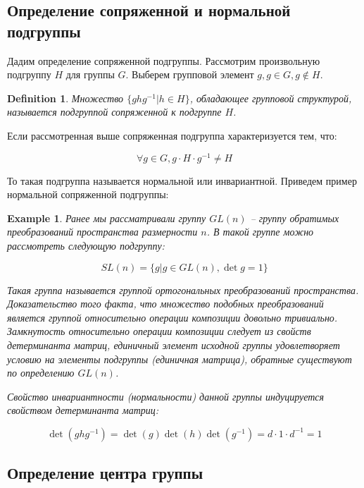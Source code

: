 \documentclass[10pt,a4paper]{article}
\newtheorem{defin}{Definition}
\newtheorem{exmpl}{Example}
\begin{document}
		\subsection{Определение сопряженной и нормальной подгруппы}

		 Дадим определение сопряженной подгруппы. Рассмотрим произвольную 
		 подгруппу $H$ для группы $G$. Выберем групповой элемент $g, g \in G,
		  g \notin H$.
		
		\begin{defin}
			 Множество $\lbrace ghg^{-1} | h \in H\rbrace$, обладающее
			 групповой структурой, называется подгруппой сопряженной к
			 подгруппе $H$.
		\end{defin}
		
		Если рассмотренная выше сопряженная подгруппа характеризуется тем, что:
		
		$$\forall g \in G, g\cdot H \cdot g^{-1} \neq H$$
		
		То такая подгруппа называется нормальной или инвариантной. Приведем 
		пример нормальной сопряженной подгруппы:
		
		\begin{exmpl}
			Ранее мы рассматривали группу $GL\left(n\right)$ -- группу 
			обратимых преобразований пространства размерности $n$. В такой 
			группе можно рассмотреть следующую подгруппу:
			
			$$SL\left(n\right) = \lbrace g \left.\right| g \in 
			GL\left(n\right), \det g = 1 \rbrace$$
			
			Такая группа называется группой ортогональных преобразований 
			пространства. Доказательство того факта, что множество подобных 
			преобразований является группой относительно операции композиции 
			довольно тривиально. Замкнутость относительно операции композиции 
			следует из свойств детерминанта матриц, единичный элемент исходной 
			группы удовлетворяет условию на элементы подгруппы (единичная 
			матрица), обратные существуют по определению $GL\left(n\right)$.
			
			Свойство инвариантности (нормальности) данной группы индуцируется 
			свойством детерминанта матриц:
			
			$$\det \left(ghg^{-1}\right) =  
			\det\left(g\right)\det\left(h\right)\det\left(g^{-1}\right) = 
			d \cdot 1 \cdot d^{-1} = 1$$
		\end{exmpl}  
		
		\subsection{Определение центра группы}
		
\end{document}
